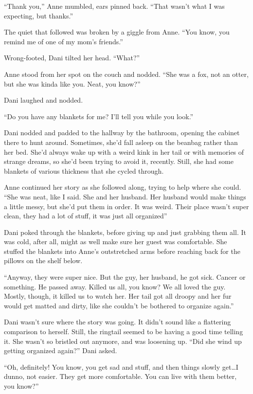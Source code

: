 ``Thank you,'' Anne mumbled, ears pinned back. ``That wasn't what I was expecting, but thanks.''

The quiet that followed was broken by a giggle from Anne. ``You know, you remind me of one of my mom's friends.''

Wrong-footed, Dani tilted her head. ``What?''

Anne stood from her spot on the couch and nodded. ``She was a fox, not an otter, but she was kinda like you. Neat, you know?''

Dani laughed and nodded.

``Do you have any blankets for me? I'll tell you while you look.''

Dani nodded and padded to the hallway by the bathroom, opening the cabinet there to hunt around. Sometimes, she'd fall asleep on the beanbag rather than her bed. She'd always wake up with a weird kink in her tail or with memories of strange dreams, so she'd been trying to avoid it, recently. Still, she had some blankets of various thickness that she cycled through.

Anne continued her story as she followed along, trying to help where she could. ``She was neat, like I said. She and her husband. Her husband would make things a little messy, but she'd put them in order. It was weird. Their place wasn't super clean, they had a lot of stuff, it was just all organized''

Dani poked through the blankets, before giving up and just grabbing them all. It was cold, after all, might as well make sure her guest was comfortable. She stuffed the blankets into Anne's outstretched arms before reaching back for the pillows on the shelf below.

``Anyway, they were super nice. But the guy, her husband, he got sick. Cancer or something. He passed away. Killed us all, you know? We all loved the guy. Mostly, though, it killed us to watch her. Her tail got all droopy and her fur would get matted and dirty, like she couldn't be bothered to organize again.''

Dani wasn't sure where the story was going. It didn't sound like a flattering comparison to herself. Still, the ringtail seemed to be having a good time telling it. She wasn't so bristled out anymore, and was loosening up. ``Did she wind up getting organized again?'' Dani asked.

``Oh, definitely! You know, you get sad and stuff, and then things slowly get\ldots{}I dunno, not easier. They get more comfortable. You can live with them better, you know?''

